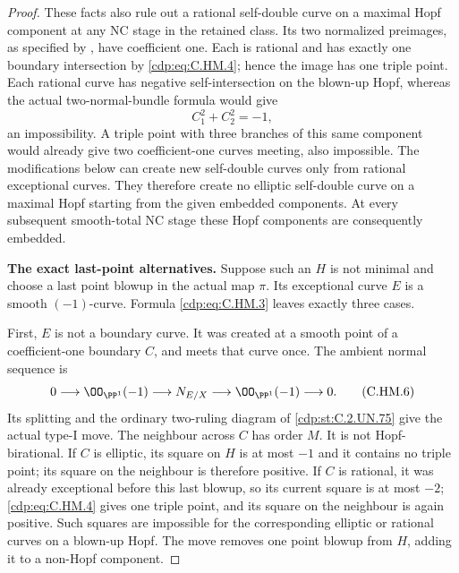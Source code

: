 \begin{proof}
These facts also rule out a rational self-double curve
on a maximal Hopf component at any NC stage in the
retained class.  Its two normalized preimages, as
specified by \cite[\S4.11.2(III)]{Kulikov1977}, have
coefficient one.  Each is rational and has exactly one
boundary intersection by \eqref{cdp:eq:C.HM.4}; hence the image has
one triple point.  Each rational curve has negative
self-intersection on the blown-up Hopf, whereas the
actual two-normal-bundle formula would give
\[
              C_1^2+C_2^2=-1,
\tag{C.HM.5}\label{cdp:eq:C.HM.5}
\]
an impossibility.  A triple point with three branches
of this same component would already give two
coefficient-one curves meeting, also impossible.
The modifications below can create new self-double
curves only from rational exceptional curves.
They therefore create no elliptic self-double curve
on a maximal Hopf starting from the given embedded
components.  At every subsequent smooth-total NC
stage these Hopf components are consequently embedded.

\par\medskip\noindent\textbf{The exact last-point alternatives.}
Suppose such an \(H\) is not minimal and choose a last
point blowup in the actual map \(\pi\).  Its exceptional
curve \(E\) is a smooth \((-1)\)-curve.  Formula
\eqref{cdp:eq:C.HM.3} leaves exactly three cases.

First, \(E\) is not a boundary curve.  It was created
at a smooth point of a coefficient-one boundary \(C\),
and meets that curve once.  The ambient normal
sequence is
\[
 0\longrightarrow\OO_{\PP^1}(-1)
 \longrightarrow N_{E/X}
 \longrightarrow\OO_{\PP^1}(-1)\longrightarrow0 .
\tag{C.HM.6}\label{cdp:eq:C.HM.6}
\]
Its splitting and the ordinary two-ruling diagram of
\ref{cdp:st:C.2.UN.75} give the actual type-I move.  The neighbour across
\(C\) has order \(M\).  It is not Hopf-birational.
If \(C\) is elliptic, its square on \(H\) is at most
\(-1\) and it contains no triple point; its square on
the neighbour is therefore positive.  If \(C\) is
rational, it was already exceptional before this last
blowup, so its current square is at most \(-2\);
\eqref{cdp:eq:C.HM.4} gives one triple point, and its square on
the neighbour is again positive.  Such squares are
impossible for the corresponding elliptic or rational
curves on a blown-up Hopf.  The move removes one
point blowup from \(H\), adding it to a non-Hopf
component.


\end{proof}
